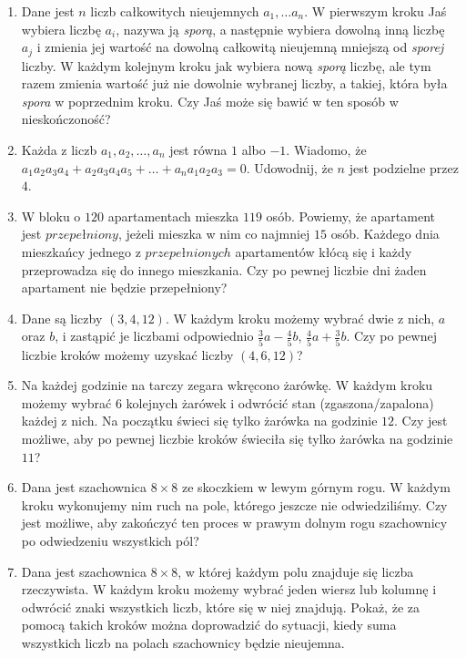 \documentclass{article}
\begin{document}
\begin{enumerate}
\begin{enumerate}[1.]
				\item Dane jest $n$ liczb całkowitych nieujemnych $a_1, \ldots a_n$. W pierwszym kroku Jaś wybiera liczbę $a_i$, nazywa ją \textit{sporą}, a następnie wybiera dowolną inną liczbę $a_j$ i zmienia jej wartość na dowolną całkowitą nieujemną mniejszą od \textit{sporej} liczby. W każdym kolejnym kroku jak wybiera nową \textit{sporą} liczbę, ale tym razem zmienia wartość już nie dowolnie wybranej liczby, a takiej, która była \textit{spora} w poprzednim kroku. Czy Jaś może się bawić w ten sposób w nieskończoność?
					
				\item Każda z liczb $a_1, a_2, \ldots , a_n$ jest równa $1$ albo $-1$. Wiadomo, że $a_1 a_2 a_3 a_4 + a_2 a_3 a_4 a_5 + \ldots + a_n a_1 a_2 a_3 = 0$. Udowodnij, że $n$ jest podzielne przez $4$.
				
				\item W bloku o $120$ apartamentach mieszka $119$ osób. Powiemy, że apartament jest $przepełniony$, jeżeli mieszka w nim co najmniej $15$ osób. Każdego dnia mieszkańcy jednego z $przepełnionych$ apartamentów kłócą się i każdy przeprowadza się do innego mieszkania. Czy po pewnej liczbie dni żaden apartament nie będzie przepełniony?
				
				\item Dane są liczby $(3, 4, 12)$. W każdym kroku możemy wybrać dwie z nich, $a$ oraz $b$, i zastąpić je liczbami odpowiednio $\frac{3}{5}a - \frac{4}{5}b$, $\frac{4}{5}a + \frac{3}{5}b$. Czy po pewnej liczbie kroków możemy uzyskać liczby $(4, 6, 12)$?
					
				\item Na każdej godzinie na tarczy zegara wkręcono żarówkę. W każdym kroku możemy wybrać $6$ kolejnych żarówek i odwrócić stan (zgaszona/zapalona) każdej z nich. Na początku świeci się tylko żarówka na godzinie $12$. Czy jest możliwe, aby po pewnej liczbie kroków świeciła się tylko żarówka na godzinie $11$?
				
				\item Dana jest szachownica $8 \times 8$ ze skoczkiem w lewym górnym rogu. W każdym kroku wykonujemy nim ruch na pole, którego jeszcze nie odwiedziliśmy. Czy jest możliwe, aby zakończyć ten proces w prawym dolnym rogu szachownicy po odwiedzeniu wszystkich pól?
				
				\item Dana jest szachownica $8 \times 8$, w której każdym polu znajduje się liczba rzeczywista. W każdym kroku możemy wybrać jeden wiersz lub kolumnę i odwrócić znaki wszystkich liczb, które się w niej znajdują. Pokaż, że za pomocą takich kroków można doprowadzić do sytuacji, kiedy suma wszystkich liczb na polach szachownicy będzie nieujemna.
				

\end{enumerate}
\end{enumerate}
\end{document}
